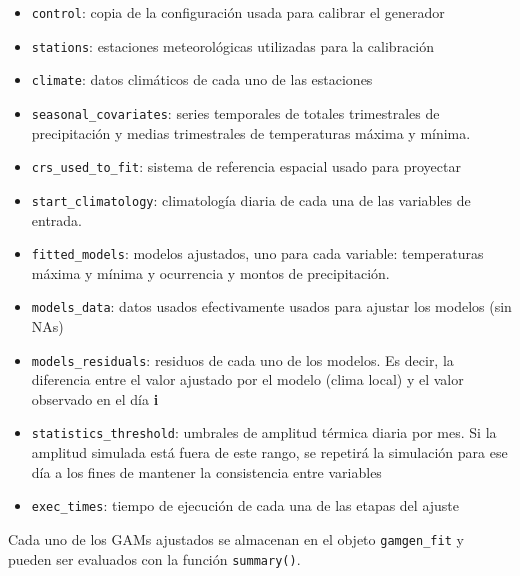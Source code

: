 \documentclass[
  12pt]{article}
\newenvironment{Shaded}{}{}
\newcommand{\CommentTok}[1]{\textcolor[rgb]{0.38,0.63,0.69}{\textit{#1}}}
\newcommand{\DataTypeTok}[1]{\textcolor[rgb]{0.56,0.13,0.00}{#1}}
\newcommand{\KeywordTok}[1]{\textcolor[rgb]{0.00,0.44,0.13}{\textbf{#1}}}
\newcommand{\NormalTok}[1]{#1}
\newcommand{\OperatorTok}[1]{\textcolor[rgb]{0.40,0.40,0.40}{#1}}
\newcommand{\StringTok}[1]{\textcolor[rgb]{0.25,0.44,0.63}{#1}}
\providecommand{\tightlist}{%
  \setlength{\itemsep}{0pt}\setlength{\parskip}{0pt}}
\begin{document}
\begin{itemize}
\tightlist
\item
  \texttt{control}: copia de la configuración usada para calibrar el generador
\item
  \texttt{stations}: estaciones meteorológicas utilizadas para la calibración
\item
  \texttt{climate}: datos climáticos de cada uno de las estaciones
\item
  \texttt{seasonal\_covariates}: series temporales de totales trimestrales de precipitación y medias trimestrales de temperaturas máxima y mínima.
\item
  \texttt{crs\_used\_to\_fit}: sistema de referencia espacial usado para proyectar
\item
  \texttt{start\_climatology}: climatología diaria de cada una de las variables de entrada.
\item
  \texttt{fitted\_models}: modelos ajustados, uno para cada variable: temperaturas máxima y mínima y ocurrencia y montos de precipitación.
\item
  \texttt{models\_data}: datos usados efectivamente usados para ajustar los modelos (sin NAs)
\item
  \texttt{models\_residuals}: residuos de cada uno de los modelos. Es decir, la diferencia entre el valor ajustado por el modelo (clima local) y el valor observado en el día \textbf{i}
\item
  \texttt{statistics\_threshold}: umbrales de amplitud térmica diaria por mes. Si la amplitud simulada está fuera de este rango, se repetirá la simulación para ese día a los fines de mantener la consistencia entre variables
\item
  \texttt{exec\_times}: tiempo de ejecución de cada una de las etapas del ajuste
\end{itemize}

Cada uno de los GAMs ajustados se almacenan en el objeto \texttt{gamgen\_fit} y pueden ser evaluados con la función \texttt{summary()}.

\begin{Shaded}
\end{Shaded}
\end{document}
